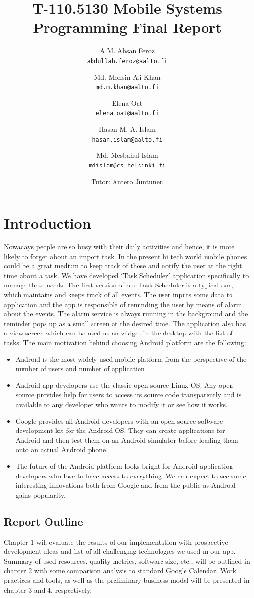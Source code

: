 \documentclass[10pt,a4paper]{report}
\author{A.M. Ahsan Feroz \\
\texttt{abdullah.feroz@aalto.fi}
\and
Md. Mohsin Ali Khan \\
\texttt{md.m.khan@aalto.fi}
\and
Elena Oat\\
\texttt{elena.oat@aalto.fi}
\and
Hasan M. A. Islam \\
\texttt{hasan.islam@aalto.fi}
\and
Md. Mesbahul Islam\\
\texttt{mdislam@cs.helsinki.fi} \\
\and
Tutor: Antero Juntunen
}
\title{T-110.5130 Mobile Systems Programming Final Report}
\begin{document}
\maketitle

\tableofcontents

\chapter{Introduction}
 

Nowadays people are so busy with their daily activities and hence, it is more likely to forget about an import task. In the present hi tech world mobile phones could be a great medium to keep track of those and notify the user at the right time about a task. We have developed $'$Task Scheduler$'$ application specifically to manage these needs. The first version of our Task Scheduler is a typical one, which maintains and keeps track of all events. The user inputs some data to application and the app is responsible of reminding the user by means of alarm about the events. The alarm service is always running in the background and the reminder pops up as a small screen at the desired time. The application also has a view screen which can be used as an widget in the desktop with the list of tasks. The main motivation behind choosing Android platform are the following:

 \begin{itemize}
   \item Android is the most widely used mobile platform from the perspective of the number of users and number of application
   \item Android app developers use the classic open source Linux OS. Any open source provides help for users to access its source code transparently and is available to any developer who wants to modify it or see how it works.
   \item Google provides all Android developers with an open source software development kit for the Android OS. They can create applications for Android and then test them on an Android simulator before loading them onto an actual Android phone.
   \item The future of the Android platform looks bright for Android application developers who love to have access to everything. We can expect to see some interesting innovations both from Google and from the public as Android gains popularity.
 \end{itemize}

\section{Report Outline}
Chapter 1 will evaluate the results of our implementation with prospective development ideas and list of all challenging technologies we used in our app. Summary of used resources, quality metrics, software size, etc., will be outlined in chapter 2 with some comparison analysis to standard Google Calendar. Work practices and tools, as well as the preliminary business model will be presented in chapter 3 and 4, respectively.
\end{document}

